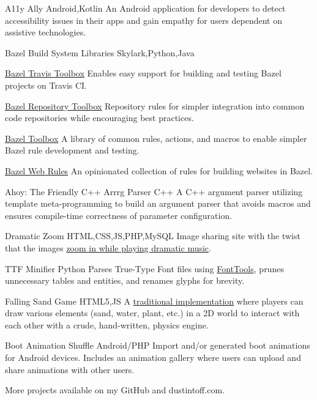  {A11y Ally} {Android,Kotlin} {
    An Android application for developers to detect accessibility issues in their apps and gain empathy for users dependent on assistive technologies.
}

\personalProject {} {Bazel Build System Libraries} {Skylark,Python,Java} {
    \begin {minimalItemize}
        \item \href {https://github.com/quittle/bazel_travis_toolbox} {Bazel Travis Toolbox} \spaceendash Enables easy support for building and testing Bazel projects on Travis CI\@.
        \item \href {https://github.com/quittle/bazel_repository_toolbox} {Bazel Repository Toolbox} \spaceendash Repository rules for simpler integration into common code repositories while encouraging best practices.
        \item \href {https://github.com/quittle/bazel_toolbox} {Bazel Toolbox} \spaceendash A library of common rules, actions, and macros to enable simpler Bazel rule development and testing.
        \item \href {https://github.com/quittle/rules_web} {Bazel Web Rules} \spaceendash An opinionated collection of rules for building websites in Bazel.
    \end {minimalItemize}
}

 {Ahoy: The Friendly C++ Arrrg Parser} {C++} {
    A C++ argument parser utilizing template meta-programming to build an argument parser that avoids macros and ensures compile-time correctness of parameter configuration.
}

 {Dramatic Zoom} {HTML,CSS,JS,PHP,MySQL} {
    Image sharing site with the twist that the images \href {https://youtu.be/a1Y73sPHKxw} {zoom in while playing dramatic music}.
}

 {TTF Minifier} {Python} {
    Parses True-Type Font files using \href {https://github.com/fonttools/fonttools} {FontTools}, prunes unnecessary tables and entities, and renames glyphs for brevity.
}

 {Falling Sand Game} {HTML5,JS} {
    A \href {https://en.wikipedia.org/wiki/Falling-sand_game} {traditional implementation} where players can draw various elements (sand, water, plant, etc.) in a 2D world to interact with each other with a crude, hand-written, physics engine.
}

 {Boot Animation Shuffle} {Android/PHP} {
    Import and/or generated boot animations for Android devices. Includes an animation gallery where users can upload and share animations with other users.
}

More projects available on { {my GitHub}} and { {dustintoff.com}}.
